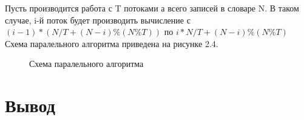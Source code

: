 \documentclass[12pt,a4paper]{report}
\begin{document}
Пусть производится работа с T потоками а всего записей в словаре N. В таком случае, i-й поток будет производить вычисление с $ (i - 1) * (N / T  + (N - i) \% (N \% T)) $  по $ i * N / T + (N - i) \% (N \% T) $ 
Схема паралельного алгоритма приведена на рисунке 2.4.

\begin{figure}[H]
    \caption{Схема паралельного алгоритма}
    \label{fig:image}
\end{figure}


\section{Вывод}
\end{document}
